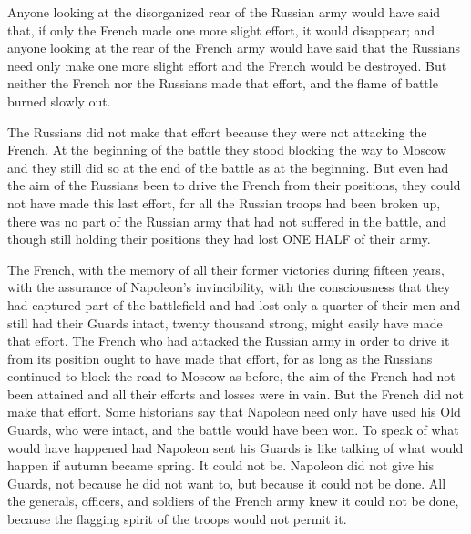 Anyone looking at the disorganized rear of the Russian army would
have said that, if only the French made one more slight effort,
it would disappear; and anyone looking at the rear of the French
army would have said that the Russians need only make one more
slight effort and the French would be destroyed. But neither the
French nor the Russians made that effort, and the flame of battle
burned slowly out.

The Russians did not make that effort because they were not
attacking the French. At the beginning of the battle they stood
blocking the way to Moscow and they still did so at the end of
the battle as at the beginning. But even had the aim of the
Russians been to drive the French from their positions, they
could not have made this last effort, for all the Russian troops
had been broken up, there was no part of the Russian army that
had not suffered in the battle, and though still holding their
positions they had lost ONE HALF of their army.

The French, with the memory of all their former victories during
fifteen years, with the assurance of Napoleon's invincibility,
with the consciousness that they had captured part of the
battlefield and had lost only a quarter of their men and still
had their Guards intact, twenty thousand strong, might easily
have made that effort. The French who had attacked the Russian
army in order to drive it from its position ought to have made
that effort, for as long as the Russians continued to block the
road to Moscow as before, the aim of the French had not been
attained and all their efforts and losses were in vain. But the
French did not make that effort. Some historians say that
Napoleon need only have used his Old Guards, who were intact, and
the battle would have been won. To speak of what would have
happened had Napoleon sent his Guards is like talking of what
would happen if autumn became spring. It could not be. Napoleon
did not give his Guards, not because he did not want to, but
because it could not be done. All the generals, officers, and
soldiers of the French army knew it could not be done, because
the flagging spirit of the troops would not permit it.

